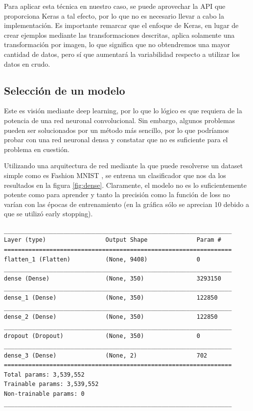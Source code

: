 Para aplicar esta técnica en nuestro caso, se puede aprovechar la API que proporciona Keras a tal efecto, por lo que no es necesario llevar a cabo la implementación. Es importante remarcar que el enfoque de Keras, en lugar de crear ejemplos mediante las transformaciones descritas, aplica solamente una transformación por imagen, lo que significa que no obtendremos una mayor cantidad de datos, pero sí que aumentará la variabilidad respecto a utilizar los datos en crudo.

\subsection{Selección de un modelo}

Este es visión mediante deep learning, por lo que lo lógico es que requiera de la potencia de una red neuronal convolucional. Sin embargo, algunos problemas pueden ser solucionados por un método más sencillo, por lo que podríamos probar con una red neuronal densa y constatar que no es suficiente para el problema en cuestión.

Utilizando una arquitectura de red mediante la que puede resolverse un dataset simple como es Fashion MNIST \cite{art:xiao2017fashionmnist}, se entrena un clasificador que nos da los resultados en la figura \ref{fig:dense}. Claramente, el modelo no es lo suficientemente potente como para aprender y tanto la precisión como la función de loss no varían con las épocas de entrenamiento (en la gráfica sólo se aprecian 10 debido a que se utilizó early stopping).

\renewcommand{\lstlistingname}{Código}
\begin{lstlisting}[caption={Arquitectura de la red densa.},captionpos=b]
_________________________________________________________________
Layer (type)                 Output Shape              Param #   
=================================================================
flatten_1 (Flatten)          (None, 9408)              0         
_________________________________________________________________
dense (Dense)                (None, 350)               3293150   
_________________________________________________________________
dense_1 (Dense)              (None, 350)               122850    
_________________________________________________________________
dense_2 (Dense)              (None, 350)               122850    
_________________________________________________________________
dropout (Dropout)            (None, 350)               0         
_________________________________________________________________
dense_3 (Dense)              (None, 2)                 702       
=================================================================
Total params: 3,539,552
Trainable params: 3,539,552
Non-trainable params: 0
_________________________________________________________________
\end{lstlisting}

